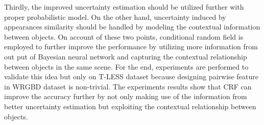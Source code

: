 Thirdly, the improved uncertainty estimation should be utilized further with proper probabilistic model. On the other hand, uncertainty induced by appearances similarity should be handled by modeling the contextual information between objects. On account of these two points, conditional random field is employed to further improve the performance by utilizing more information from out put of Bayesian neural network and capturing the contextual relationship between objects in the same scene. For the end, experiments are performed to validate this idea but only on T-LESS dataset because designing pairwise feature in WRGBD dataset is non-trivial. The experiments results show that CRF can improve the accuracy further by not only making use of the information from better uncertainty estimation but exploiting the contextual relationship between objects.

